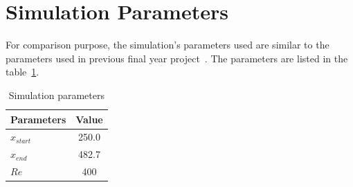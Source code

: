 \section{Simulation Parameters}
For comparison purpose, the simulation's parameters used are similar to the parameters used in previous final year project~\cite{indra}. The parameters are listed in the table~\ref{tab:params}.
\begin{table}[h]
  \centering
  \begin{tabular}[h]{l c}
    \hline\hline
    Parameters & Value\\
    \hline
    $x_{start}$ & 250.0 \\
    $x_{end}$ & 482.7 \\
    $Re$ & 400 \\
    \hline
  \end{tabular}
  \caption{Simulation parameters}
  \label{tab:params}
\end{table}